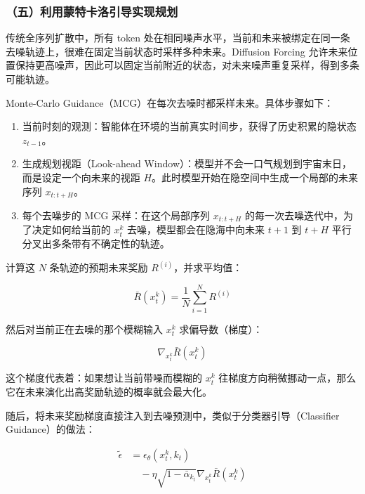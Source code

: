 \hypertarget{ux4e94ux5229ux7528ux8499ux7279ux5361ux6d1bux5f15ux5bfcux5b9eux73b0ux89c4ux5212}{%
\subsubsection{（五）利用蒙特卡洛引导实现规划}\label{ux4e94ux5229ux7528ux8499ux7279ux5361ux6d1bux5f15ux5bfcux5b9eux73b0ux89c4ux5212}}

传统全序列扩散中，所有 token 处在相同噪声水平，当前和未来被绑定在同一条去噪轨迹上，很难在固定当前状态时采样多种未来。Diffusion Forcing 允许未来位置保持更高噪声，因此可以固定当前附近的状态，对未来噪声重复采样，得到多条可能轨迹。

Monte-Carlo Guidance（MCG）在每次去噪时都采样未来。具体步骤如下：

\begin{enumerate}
\def\labelenumi{\arabic{enumi}.}
\tightlist
\item
  当前时刻的观测：智能体在环境的当前真实时间步，获得了历史积累的隐状态 \(z_{t-1}\)。
\item
  生成规划视距（Look-ahead Window）：模型并不会一口气规划到宇宙末日，而是设定一个向未来的视距 \(H\)。此时模型开始在隐空间中生成一个局部的未来序列 \(x_{t:t+H}\)。
\item
  每个去噪步的 MCG 采样：在这个局部序列 \(x_{t:t+H}\) 的每一次去噪迭代中，为了决定如何给当前的 \(x_t^k\) 去噪，模型都会在隐海中向未来 \(t+1\) 到 \(t+H\) 平行分叉出多条带有不确定性的轨迹。
\end{enumerate}

计算这 \(N\) 条轨迹的预期未来奖励 \(R^{(i)}\)，并求平均值：

\[
\bar{R}(x_t^k)=\frac{1}{N}\sum_{i=1}^N R^{(i)}
\]

然后对当前正在去噪的那个模糊输入 \(x_t^k\) 求偏导数（梯度）：

\[
\nabla_{x_t^k}\bar{R}(x_t^k)
\]

这个梯度代表着：如果想让当前带噪而模糊的 \(x_t^k\) 往梯度方向稍微挪动一点，那么它在未来演化出高奖励轨迹的概率就会最大化。

随后，将未来奖励梯度直接注入到去噪预测中，类似于分类器引导（Classifier Guidance）的做法：

\[
\begin{aligned}
\tilde{\epsilon}
&=
\epsilon_\theta(x_t^k,k_t)
\\
&\quad -
\eta\sqrt{1-\bar{\alpha}_{k_t}}\nabla_{x_t^k}\bar{R}(x_t^k)
\end{aligned}
\]

